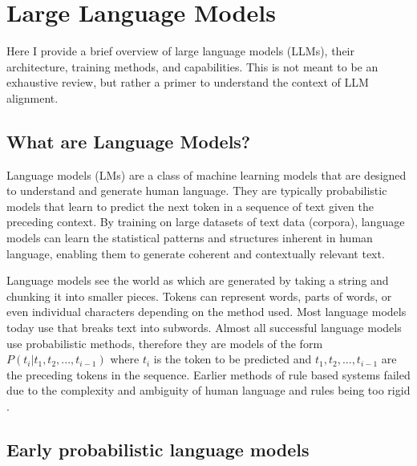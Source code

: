 \section{Large Language Models}
\label{sec:LLMs}

Here I provide a brief overview of large language models (LLMs), their architecture, training methods, and capabilities. This is not meant to be an exhaustive review, but rather a primer to understand the context of LLM alignment.

\subsection{What are Language Models?}

Language models (LMs) are a class of machine learning models that are designed to understand and generate human language. They are typically probabilistic models that learn to predict the next token in a sequence of text given the preceding context. By training on large datasets of text data (corpora), language models can learn the statistical patterns and structures inherent in human language, enabling them to generate coherent and contextually relevant text.

Language models see the world as  which are generated by taking a string and chunking it into smaller pieces. Tokens can represent words, parts of words, or even individual characters depending on the  method used. Most language models today use  \cite{philipgageNewAlgorithmData1994} that breaks text into subwords. Almost all successful language models use probabilistic methods, therefore they are models of the form $P(t_i|t_1, t_2, ..., t_{i-1})$ where $t_i$ is the token to be predicted and $t_1, t_2, ..., t_{i-1}$ are the preceding tokens in the sequence. Earlier methods of rule based systems failed due to the complexity and ambiguity of human language and rules being too rigid \cite{NADKARNI201685,malteEvolutionTransferLearning2019}.

\subsection{Early probabilistic language models}

